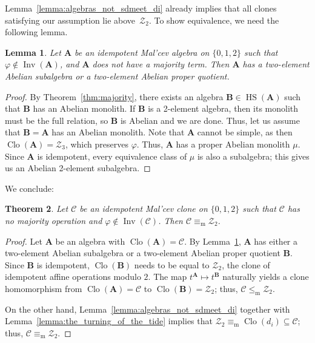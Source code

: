 \documentclass[12pt]{amsart}
\newtheorem{theorem}{Theorem}[section]
\newtheorem{lemma}[theorem]{Lemma}
\theoremstyle{definition}
\theoremstyle{definition}
\newcommand{\clo}[1]{\mathcal{#1}}
\newcommand{\alg}[1]{\mathbf{#1}}
\newcommand{\algA}{\alg{A}}
\newcommand{\algB}{\alg{B}}
\DeclareMathOperator{\Clo}{Clo}
\DeclareMathOperator{\Inv}{Inv}
\newcommand{\isaminorof}{\leq_{\mathrm{m}}}
\newcommand{\minorequivalentto}{\equiv_{\mathrm{m}}}
\DeclareMathOperator{\HS}{HS}
\begin{document}
Lemma~\ref{lemma:algebras_not_sdmeet_di} already implies that all clones satisfying our assumption lie above~$\clo{Z}_2$. To show equivalence, we need the following lemma.

\begin{lemma}\label{lemma:algebras_not_sdmeet_subalgebras}
    Let $\algA$ be an idempotent Mal'cev algebra on $\{0,1,2\}$ such that $\varphi \notin \Inv(\algA)$, and $\alg{A}$ does not have a majority term. Then $\alg{A}$ has a two-element Abelian subalgebra or a two-element Abelian proper quotient. 
\end{lemma}
\begin{proof}
By Theorem~\ref{thm:majority}, there exists an algebra $\algB \in \HS(\algA)$ such that $\algB$ has an Abelian monolith. If $\algB$ is a 2-element algebra, then its monolith must be the full relation, so $\algB$ is Abelian and we are done. Thus, let us assume that $\algB = \algA$ has an Abelian monolith. Note that $\algA$ cannot be simple, as then $\Clo(\algA) = \mathcal Z_3$, which preserves $\varphi$. Thus, $\algA$ has a proper Abelian monolith $\mu$. Since $\algA$ is idempotent, every equivalence class of $\mu$ is also a subalgebra; this gives us an Abelian 2-element subalgebra.
\end{proof}

We conclude:

\begin{theorem}\label{thm:notmajority}
Let $\clo{C}$ be an idempotent Mal'cev clone on $\{0,1,2\}$ such that $\clo{C}$ has no majority operation and $\varphi \notin \Inv(\clo{C})$. Then $\clo{C}\minorequivalentto \clo{Z}_2$. 
\end{theorem}
\begin{proof}
Let $\algA$ be an algebra with $\Clo(\algA) = \clo{C}$. By Lemma~\ref{lemma:algebras_not_sdmeet_subalgebras}, $\alg{A}$ has either a two-element Abelian subalgebra or a two-element Abelian proper quotient $\algB$. Since $\algB$ is idempotent, $\Clo(\algB)$ needs to be equal to $\clo{Z}_2$, the clone of idempotent affine operations modulo $2$. The map $t^{\algA} \mapsto t^{\algB}$ naturally yields a clone homomorphism from $\Clo(\algA) = \clo{C}$ to $\Clo(\algB) = \clo{Z}_2$; thus, $\clo{C} \isaminorof \clo{Z}_2$. 

On the other hand, Lemma~\ref{lemma:algebras_not_sdmeet_di} together with Lemma~\ref{lemma:the_turning_of_the_tide} implies that $\mathcal Z_2 \minorequivalentto\Clo(d_i) \subseteq \mathcal C$; thus, $\clo{C}\minorequivalentto \clo{Z}_2$.
\end{proof}
\end{document}
